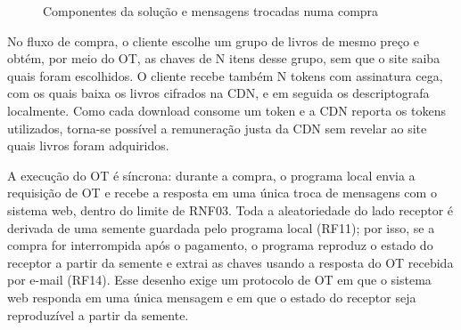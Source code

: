 \begin{figure}[htbp]
\centering
\caption{Componentes da solução e mensagens trocadas numa compra}\label{fig:arquitetura}
\end{figure}

No fluxo de compra, o cliente escolhe um grupo de livros de mesmo preço e
obtém, por meio do OT, as chaves de N itens desse grupo, sem que o site saiba
quais foram escolhidos. O cliente recebe também N tokens com assinatura cega,
com os quais baixa os livros cifrados na CDN, e em seguida os descriptografa
localmente. Como cada download consome um token e a CDN reporta os tokens
utilizados, torna-se possível a remuneração justa da CDN sem revelar ao site
quais livros foram adquiridos.

A execução do OT é síncrona: durante a compra, o programa local envia a
requisição de OT e recebe a resposta em uma única troca de mensagens com o
sistema web, dentro do limite de RNF03. Toda a aleatoriedade do lado receptor
é derivada de uma semente guardada pelo programa local (RF11); por isso, se a
compra for interrompida após o pagamento, o programa reproduz o estado do
receptor a partir da semente e extrai as chaves usando a resposta do OT
recebida por e-mail (RF14). Esse desenho exige um protocolo de OT em que o
sistema web responda em uma única mensagem e em que o estado do receptor seja
reproduzível a partir da semente.

